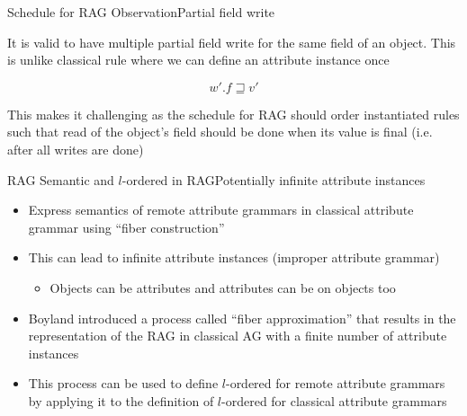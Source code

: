 \begin{frame}{Schedule for RAG Observation}{Partial field write}

It is valid to have \alert{multiple partial field write} for the same field of an object. This is \alert{unlike classical rule} where we can define an attribute instance \alert{once}

\[ w'.f \sqsupseteq v' \]

\newlinevspace

This makes it challenging as the schedule for RAG should order instantiated rules such that \alert{read of the object's field} should be done when its value is \alert{final} (i.e. after all writes are done)

\end{frame}






\begin{frame}{RAG Semantic and $l$-ordered in RAG}{Potentially infinite attribute instances}
    
\begin{itemize}
    \item Express \alert{semantics of remote attribute grammars} in classical attribute grammar using \enquote{fiber construction}
    \item This can lead to \alert{infinite} attribute instances (\alert{improper attribute grammar})
    \begin{itemize}
        \item Objects can be attributes and attributes can be on objects too
    \end{itemize}
    \item Boyland \cite{Boyland05remoteattribute} introduced a process called \enquote{fiber approximation} that results in the representation of the RAG in classical AG with a \alert{finite number of attribute instances}
    \item This process can be used to define $l$-ordered for remote attribute grammars by applying it to the definition of $l$-ordered for classical attribute grammars 
\end{itemize}

\end{frame}

